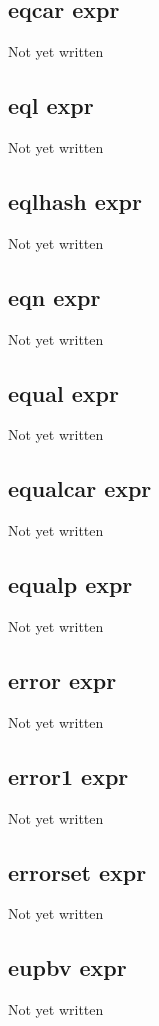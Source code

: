 \documentclass[a4paper,11pt]{article}
\begin{document}
\subsection{\ttfamily eqcar expr}
Not yet written

\subsection{\ttfamily eql expr}
Not yet written

\subsection{\ttfamily eqlhash expr}
Not yet written

\subsection{\ttfamily eqn expr}
Not yet written

\subsection{\ttfamily equal expr}
Not yet written

\subsection{\ttfamily equalcar expr}
Not yet written

\subsection{\ttfamily equalp expr}
Not yet written

\subsection{\ttfamily error expr}
Not yet written

\subsection{\ttfamily error1 expr}
Not yet written

\subsection{\ttfamily errorset expr}
Not yet written

\subsection{\ttfamily eupbv expr}
Not yet written
\end{document}
